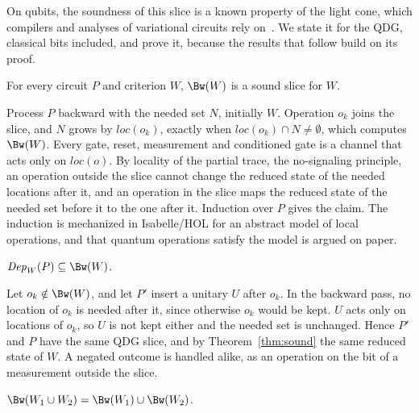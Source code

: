 On qubits, the soundness of this slice is a known property of the light cone, which compilers and analyses of
variational circuits rely on~\cite{murali2019triq, farhi2014qaoa}. We state it for the QDG, classical bits included,
and prove it, because the results that follow build on its proof.

\begin{theorem}\label{thm:sound}
For every circuit $P$ and criterion $W$, $\Bw(W)$ is a sound slice for $W$.
\end{theorem}

\begin{IEEEproof}
Process $P$ backward with the needed set $N$, initially $W$. Operation $o_k$ joins the slice, and $N$ grows by
$\mathit{loc}(o_k)$, exactly when $\mathit{loc}(o_k) \cap N \neq \emptyset$, which computes $\Bw(W)$. Every gate,
reset, measurement and conditioned gate is a channel that acts only on $\mathit{loc}(o)$. By locality of the partial
trace, the no-signaling principle, an operation outside the slice cannot change the reduced state of the needed
locations after it, and an operation in the slice maps the reduced state of the needed set before it to the one
after it. Induction over $P$ gives the claim. The induction is mechanized in Isabelle/HOL for an abstract model of
local operations, and that quantum operations satisfy the model is argued on paper.
\end{IEEEproof}

\begin{proposition}\label{prop:complete}
$\mathit{Dep}_W(P) \subseteq \Bw(W)$.
\end{proposition}

\begin{IEEEproof}
Let $o_k \notin \Bw(W)$, and let $P'$ insert a unitary $U$ after $o_k$. In the backward pass, no location of
$o_k$ is needed after it, since otherwise $o_k$ would be kept. $U$ acts only on locations of $o_k$, so $U$ is not
kept either and the needed set is unchanged. Hence $P'$ and $P$ have the same QDG slice, and by
Theorem~\ref{thm:sound} the same reduced state of $W$. A negated outcome is handled alike, as an operation on the
bit of a measurement outside the slice.
\end{IEEEproof}

\begin{proposition}\label{prop:joint}
$\Bw(W_1 \cup W_2) = \Bw(W_1) \cup \Bw(W_2)$.
\end{proposition}

